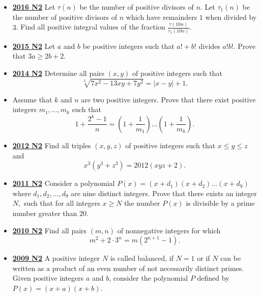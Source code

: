 \documentclass[11pt]{scrartcl}
\begin{document}
\begin{itemize}[leftmargin=*]
Prove that Eduardo has a winning strategy.
\item \href{https://artofproblemsolving.com/community/c6h1480726p8639339}{\textbf{2016 N2}} Let $\tau(n)$ be the number of positive divisors of $n$. Let $\tau_1(n)$ be the number of positive divisors of $n$ which have remainders $1$ when divided by $3$. Find all positive integral values of the fraction $\frac{\tau(10n)}{\tau_1(10n)}$.
\item \href{https://artofproblemsolving.com/community/c6h1268852p6622214}{\textbf{2015 N2}} Let $a$ and $b$ be positive integers such that $a! + b!$ divides $a!b!$. Prove that $3a \geqslant  2b + 2$.
\item \href{https://artofproblemsolving.com/community/c6h1113196p5083567}{\textbf{2014 N2}} Determine all pairs $(x, y)$ of positive integers such that\[\sqrt[3]{7x^2-13xy+7y^2}=|x-y|+1.\]
\item {}	Assume that $k$ and $n$ are two positive integers. Prove that there exist positive integers $m_1 , \dots , m_k$ such that\[1+\frac{2^k-1}{n}=\left(1+\frac1{m_1}\right)\dots \left(1+\frac1{m_k}\right).\]
\item \href{https://artofproblemsolving.com/community/c6h546188p3160603}{\textbf{2012 N2}} Find all triples $(x,y,z)$ of positive integers such that $x \leqslant y \leqslant z$ and
\[x^3(y^3+z^3)=2012(xyz+2).\]

\item \href{https://artofproblemsolving.com/community/c6h488540p2737650}{\textbf{2011 N2}} Consider a polynomial $P(x) =  (x+d_1)(x+d_2)\dots (x+d_9)$ where $d_1, d_2, \dots , d_9$ are nine distinct integers. Prove that there exists an integer $N,$ such that for all integers $x \geqslant  N$ the number $P(x)$ is divisible by a prime number greater than $20$.

\item \href{https://artofproblemsolving.com/community/c6h418640p2361999}{\textbf{2010 N2}} Find all pairs $(m,n)$ of nonnegative integers for which\[m^2 + 2 \cdot 3^n = m\left(2^{n+1} - 1\right).\]
\item \href{https://artofproblemsolving.com/community/c6h355796p1932941}{\textbf{2009 N2}} A positive integer $N$ is called balanced, if $N=1$ or if $N$ can be written as a product of an even number of not necessarily distinct primes. Given positive integers $a$ and $b$, consider the polynomial $P$ defined by $P(x)=(x+a)(x+b)$.


\end{itemize}
\end{document}

